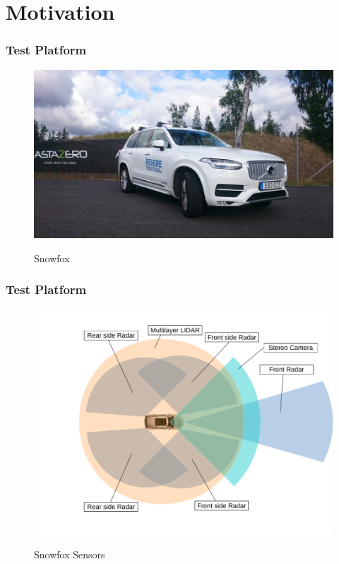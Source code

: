 \documentclass[nosymbols]{beamer}	%
\begin{document}
%
\addtocounter{framenumber}{-1}	%
\begin{frame}[plain]
	\titlepage
\end{frame}
%

	
\section{Motivation}



\begin{frame}
\frametitle{Test Platform}
\begin{figure}[!ht]
\caption{Snowfox}
\includegraphics[width=\textwidth,height=0.7\textheight,keepaspectratio]{bilder/snowfox.jpg}
\label{platform}
\end{figure}
\end{frame}

\begin{frame}
\frametitle{Test Platform}
\begin{figure}[!ht]
\caption{Snowfox Sensors}
\includegraphics[width=\textwidth,height=0.7\textheight,keepaspectratio]{sensors.pdf}
\label{platform}
\end{figure}
\end{frame}
\end{document}
